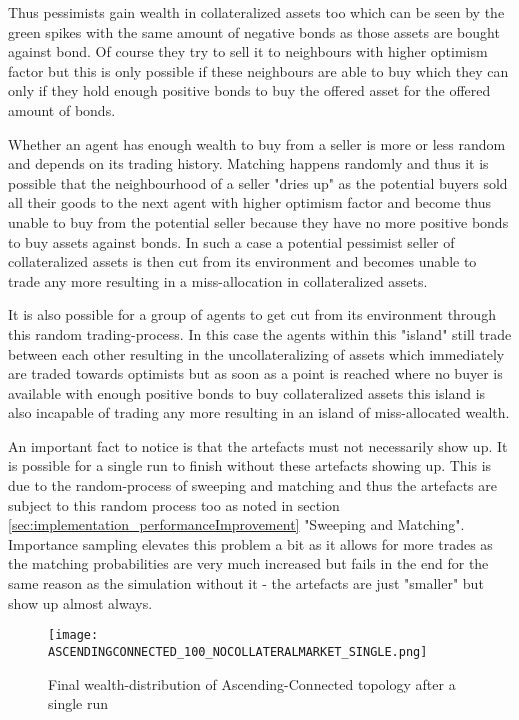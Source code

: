 \documentclass[Bachelorarbeit.tex]{subfiles}
\begin{document}
\medskip 

Thus pessimists gain wealth in collateralized assets too which can be seen by the green spikes with the same amount of negative bonds as those assets are bought against bond. Of course they try to sell it to neighbours with higher optimism factor but this is only possible if these neighbours are able to buy which they can only if they hold enough positive bonds to buy the offered asset for the offered amount of bonds.

\medskip 

Whether an agent has enough wealth to buy from a seller is more or less random and depends on its trading history. Matching happens randomly and thus it is possible that the neighbourhood of a seller "dries up" as the potential buyers sold all their goods to the next agent with higher optimism factor and become thus unable to buy from the potential seller because they have no more positive bonds to buy assets against bonds. In such a case a potential pessimist seller of collateralized assets is then cut from its environment and becomes unable to trade any more resulting in a miss-allocation in collateralized assets.

\medskip 

It is also possible for a group of agents to get cut from its environment through this random trading-process. In this case the agents within this "island" still trade between each other resulting in the uncollateralizing of assets which immediately are traded towards optimists but as soon as a point is reached where no buyer is available with enough positive bonds to buy collateralized assets this island is also incapable of trading any more resulting in an island of miss-allocated wealth.

\medskip 

An important fact to notice is that the artefacts must not necessarily show up. It is possible for a single run to finish without these artefacts showing up. This is due to the random-process of sweeping and matching and thus the artefacts are subject to this random process too as noted in section \ref{sec:implementation_performanceImprovement} "Sweeping and Matching". Importance sampling elevates this problem a bit as it allows for more trades as the matching probabilities are very much increased but fails in the end for the same reason as the simulation without it - the artefacts are just "smaller" but show up almost always.

\begin{figure}[H]
	\centering
  \texttt{[image: ASCENDINGCONNECTED\_100\_NOCOLLATERALMARKET\_SINGLE.png]}
	\caption{Final wealth-distribution of Ascending-Connected topology after a single run}
	\label{fig:wealth_ASCENDINGCONNECTED_IS_100_NOCOLLATERALMARKET_SINGLE}
\end{figure}
\end{document}
